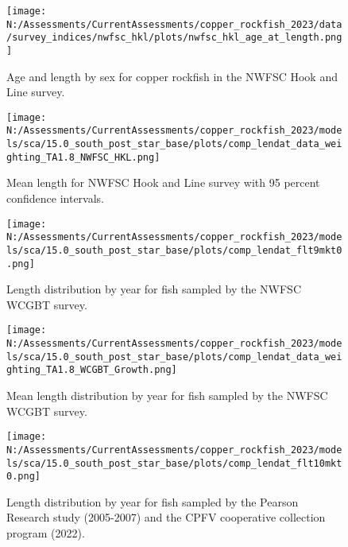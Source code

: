 \documentclass[11pt,
  english,
  letterpaper,
]{article}
\begin{document}
\pagebreak

\begin{figure}
\centering
\texttt{[image: N:/Assessments/CurrentAssessments/copper\_rockfish\_2023/data/survey\_indices/nwfsc\_hkl/plots/nwfsc\_hkl\_age\_at\_length.png]}
\caption{Age and length by sex for copper rockfish in the NWFSC Hook and Line survey.\label{fig:nwfsc-hkl-len-age}}
\end{figure}

\pagebreak

\begin{figure}
\centering
\texttt{[image: N:/Assessments/CurrentAssessments/copper\_rockfish\_2023/models/sca/15.0\_south\_post\_star\_base/plots/comp\_lendat\_data\_weighting\_TA1.8\_NWFSC\_HKL.png]}
\caption{Mean length for NWFSC Hook and Line survey with 95 percent confidence intervals.\label{fig:mean-hkl-len-data}}
\end{figure}

\pagebreak

\begin{figure}
\centering
\texttt{[image: N:/Assessments/CurrentAssessments/copper\_rockfish\_2023/models/sca/15.0\_south\_post\_star\_base/plots/comp\_lendat\_flt9mkt0.png]}
\caption{Length distribution by year for fish sampled by the NWFSC WCGBT survey.\label{fig:growth-wcgbt-len}}
\end{figure}

\pagebreak

\begin{figure}
\centering
\texttt{[image: N:/Assessments/CurrentAssessments/copper\_rockfish\_2023/models/sca/15.0\_south\_post\_star\_base/plots/comp\_lendat\_data\_weighting\_TA1.8\_WCGBT\_Growth.png]}
\caption{Mean length distribution by year for fish sampled by the NWFSC WCGBT survey.\label{fig:growth-mean-wcgbt-len}}
\end{figure}

\pagebreak

\begin{figure}
\centering
\texttt{[image: N:/Assessments/CurrentAssessments/copper\_rockfish\_2023/models/sca/15.0\_south\_post\_star\_base/plots/comp\_lendat\_flt10mkt0.png]}
\caption{Length distribution by year for fish sampled by the Pearson Research study (2005-2007) and the CPFV cooperative collection program (2022).\label{fig:growth-coop-len}}
\end{figure}
\end{document}
